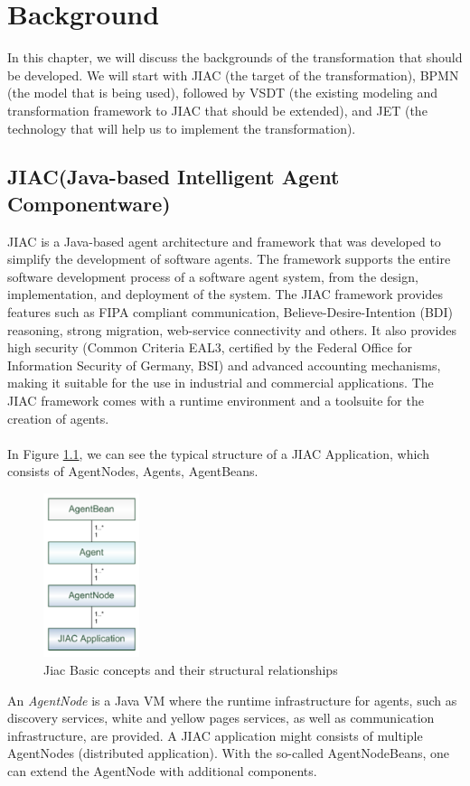 \chapter{Background}

In this chapter, we will discuss the backgrounds of the transformation that should be developed. We will start with JIAC (the target of the transformation), BPMN (the model that is being used), followed by VSDT (the existing modeling and transformation framework to JIAC that should be extended), and JET (the technology that will help us to implement the transformation).

\section{JIAC(Java-based Intelligent Agent Componentware)}
JIAC is a Java-based agent architecture and framework that was developed to simplify the development of software agents. The framework supports the entire software development process of a software agent system, from the design, implementation, and deployment of the system. The JIAC framework provides features such as FIPA compliant communication,
Believe-Desire-Intention (BDI) reasoning, strong migration, web-service
connectivity and others. It also provides high security (Common Criteria EAL3,
certified by the Federal Office for Information Security of Germany, BSI) and advanced
accounting mechanisms, making it suitable for the use in industrial and
commercial applications. The JIAC framework comes with a runtime environment
and a toolsuite for the creation of agents. \\\\ 

In Figure \ref{fig:jiac_basic}, we can see the typical structure of a JIAC Application, which consists of AgentNodes, Agents, AgentBeans.
\begin{figure}[h]
	\centering
		\includegraphics[width=0.25\textwidth]{images/jiac_basic.png}
		\caption{Jiac Basic concepts and their structural relationships \cite{JIACMAN10}}
	\label{fig:jiac_basic}
\end{figure}
An \textit{AgentNode} is a Java VM where the runtime infrastructure for agents, such as discovery services, white and yellow pages services, as well as communication infrastructure, are provided. A JIAC application might consists of multiple AgentNodes (distributed application). With the so-called AgentNodeBeans, one can extend the AgentNode with additional components.\\

